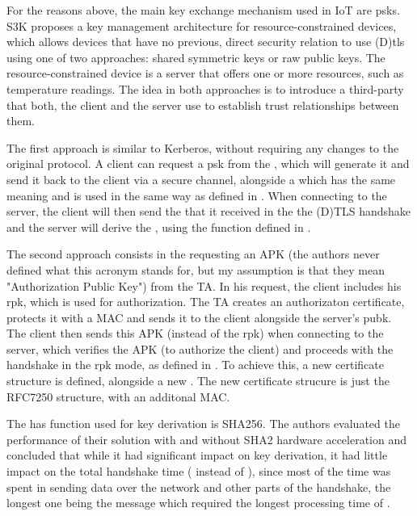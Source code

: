 \documentclass{llncs}
\begin{document}
For the reasons above, the main key exchange mechanism used in IoT
are \gls{psk}s. S3K\cite{S3KScala62:online} proposes a key management architecture for resource-constrained devices,
which allows devices that have no previous, direct security relation to use
(D)\gls{tls} using one of two approaches: shared symmetric keys or raw public keys.
The resource-constrained device is a server that offers one or more resources,
such as temperature readings. The idea in both approaches is to introduce a third-party
 that both, the client and the server use to establish
trust relationships between them.

The first approach is similar to Kerberos\cite{RFC4120}, without requiring any
changes to the original protocol. A client can request a \gls{psk}  from the ,
which will generate it and send it back to the client via a secure channel, alongside
a  which has the same meaning and is used in the same way
as defined in \cite{RFC4279}. When connecting to the server,
the client will then send the  that it received in the
the (D)TLS handshake and the server will derive the , using the
 function defined in \cite{RFC5246}.

The second approach consists in the requesting an APK (the authors never defined
what this acronym stands for, but my assumption is that they mean "Authorization Public Key")
from the TA. In his request,
the client includes his \gls{rpk}, which is used for authorization. The TA
creates an authorizaton certificate, protects it with a MAC and sends it
to the client alongside the server's \gls{pubk}.
The client then sends this APK (instead of the \gls{rpk})
when connecting to the server, which verifies the APK (to authorize the client)
and proceeds with the handshake in the \gls{rpk} mode, as defined in \cite{RFC4279}.
To achieve this, a new certificate structure is defined, alongside a new .
The new certificate strucure is just the RFC7250 \cite{RFC7250} structure, with an
additonal MAC.

The has function used for key derivation is SHA256. The authors evaluated the
performance of their solution with and without SHA2 hardware acceleration and
concluded that while it had significant impact on key derivation, it had little
impact on the total handshake time ( instead of ), since most of the time was spent in sending
data over the network and other parts of the handshake, the longest one being
the  message which required the longest processing time
of .
\end{document}
